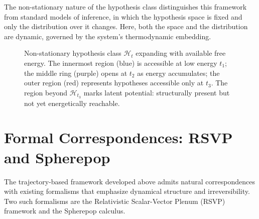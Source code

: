 \documentclass[12pt]{article}
\theoremstyle{plain}
\theoremstyle{definition}
\theoremstyle{remark}
\begin{document}
The non-stationary nature of the hypothesis class distinguishes this framework from standard models of inference, in which the hypothesis space is fixed and only the distribution over it changes. Here, both the space and the distribution are dynamic, governed by the system's thermodynamic embedding.

\begin{figure}[h]
\centering
{}
\caption{Non-stationary hypothesis class $\mathcal{H}_t$ expanding with available free energy. The innermost region (blue) is accessible at low energy $t_1$; the middle ring (purple) opens at $t_2$ as energy accumulates; the outer region (red) represents hypotheses accessible only at $t_3$. The region beyond $\mathcal{H}_{t_3}$ marks latent potential: structurally present but not yet energetically reachable.}
\label{fig:nonstationary}
\end{figure}

\section{Formal Correspondences: RSVP and Spherepop}

The trajectory-based framework developed above admits natural correspondences with existing formalisms that emphasize dynamical structure and irreversibility. Two such formalisms are the Relativistic Scalar-Vector Plenum (RSVP) framework and the Spherepop calculus.
\end{document}
